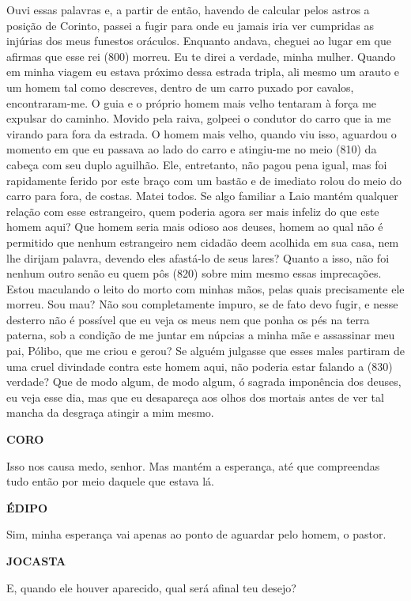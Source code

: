 Ouvi essas palavras e, a partir de então, havendo de calcular pelos
astros a posição de Corinto, passei a fugir para onde eu jamais iria ver
cumpridas as injúrias dos meus funestos oráculos. Enquanto andava,
cheguei ao lugar em que afirmas que esse rei (800) morreu. Eu te direi a
verdade, minha mulher. Quando em minha viagem eu estava próximo dessa
estrada tripla, ali mesmo um arauto e um homem tal como descreves,
dentro de um carro puxado por cavalos, encontraram-me. O guia e o
próprio homem mais velho tentaram à força me expulsar do caminho. Movido
pela raiva, golpeei o condutor do carro que ia me virando para fora da
estrada. O homem mais velho, quando viu isso, aguardou o momento em que
eu passava ao lado do carro e atingiu-me no meio (810) da cabeça com seu
duplo aguilhão. Ele, entretanto, não pagou pena igual, mas foi
rapidamente ferido por este braço com um bastão e de imediato rolou do
meio do carro para fora, de costas. Matei todos. Se algo familiar a Laio
mantém qualquer relação com esse estrangeiro, quem poderia agora ser
mais infeliz do que este homem aqui? Que homem seria mais odioso aos
deuses, homem ao qual não é permitido que nenhum estrangeiro nem cidadão
deem acolhida em sua casa, nem lhe dirijam palavra, devendo eles
afastá-lo de seus lares? Quanto a isso, não foi nenhum outro senão eu
quem pôs (820) sobre mim mesmo essas imprecações. Estou maculando o
leito do morto com minhas mãos, pelas quais precisamente ele morreu. Sou
mau? Não sou completamente impuro, se de fato devo fugir, e nesse
desterro não é possível que eu veja os meus nem que ponha os pés na
terra paterna, sob a condição de me juntar em núpcias a minha mãe e
assassinar meu pai, Pólibo, que me criou e gerou? Se alguém julgasse que
esses males partiram de uma cruel divindade contra este homem aqui, não
poderia estar falando a (830) verdade? Que de modo algum, de modo algum,
ó sagrada imponência dos deuses, eu veja esse dia, mas que eu desapareça
aos olhos dos mortais antes de ver tal mancha da desgraça atingir a mim
mesmo.

\textbf{CORO}

Isso nos causa medo, senhor. Mas mantém a esperança, até que compreendas
tudo então por meio daquele que estava lá.

\textbf{ÉDIPO}

Sim, minha esperança vai apenas ao ponto de aguardar pelo homem, o
pastor.

\textbf{JOCASTA}

E, quando ele houver aparecido, qual será afinal teu desejo?

